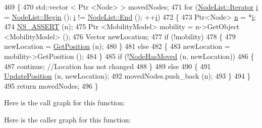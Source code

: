 \begin{DoxyCode}
469 \{
470   std::vector < Ptr <Node> > movedNodes;
471   \textcolor{keywordflow}{for} (\hyperlink{classns3_1_1NodeList_a9e2679a94efb4f0066cc21e65440364d}{NodeList::Iterator} \hyperlink{bernuolliDistribution_8m_a6f6ccfcf58b31cb6412107d9d5281426}{i} = \hyperlink{classns3_1_1NodeList_a93d2211831f5cb71d1dbb721e2721d7f}{NodeList::Begin} (); 
      \hyperlink{bernuolliDistribution_8m_a6f6ccfcf58b31cb6412107d9d5281426}{i} != \hyperlink{classns3_1_1NodeList_a027a558c16e6078e25c7ffc67becb559}{NodeList::End} (); ++\hyperlink{bernuolliDistribution_8m_a6f6ccfcf58b31cb6412107d9d5281426}{i})
472     \{
473       Ptr<Node> \hyperlink{namespacesample-rng-plot_aeb5ee5c431e338ef39b7ac5431242e1d}{n} = *\hyperlink{bernuolliDistribution_8m_a6f6ccfcf58b31cb6412107d9d5281426}{i};
474       \hyperlink{assert_8h_a6dccdb0de9b252f60088ce281c49d052}{NS\_ASSERT} (n);
475       Ptr <MobilityModel> mobility = n->GetObject <MobilityModel> ();
476       Vector newLocation;
477       \textcolor{keywordflow}{if} (!mobility)
478         \{
479           newLocation = \hyperlink{classns3_1_1AnimationInterface_abbbc42cea6e83f54004d4722395e8ee3}{GetPosition} (n);
480         \}
481       \textcolor{keywordflow}{else}
482         \{
483           newLocation = mobility->GetPosition ();
484         \}
485       \textcolor{keywordflow}{if} (!\hyperlink{classns3_1_1AnimationInterface_a0c0a9704e373d1cc4d3a00108b3daff4}{NodeHasMoved} (n, newLocation))
486         \{
487           \textcolor{keywordflow}{continue}; \textcolor{comment}{//Location has not changed}
488         \}
489       \textcolor{keywordflow}{else}
490         \{
491           \hyperlink{classns3_1_1AnimationInterface_ab751cf6f459289f0978f4bb97b93044d}{UpdatePosition} (n, newLocation);
492           movedNodes.push\_back (n);
493         \}
494     \}
495   \textcolor{keywordflow}{return} movedNodes;
496 \}
\end{DoxyCode}


Here is the call graph for this function\+:




Here is the caller graph for this function\+:


